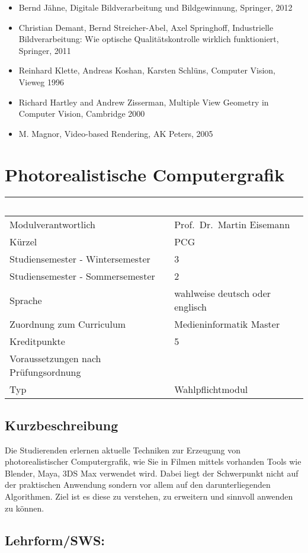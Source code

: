 \begin{itemize}
\item
  Bernd Jähne, Digitale Bildverarbeitung und Bildgewinnung, Springer,
  2012
\item
  Christian Demant, Bernd Streicher-Abel, Axel Springhoff, Industrielle
  Bildverarbeitung: Wie optische Qualitätskontrolle wirklich
  funktioniert, Springer, 2011
\item
  Reinhard Klette, Andreas Koshan, Karsten Schlüns, Computer Vision,
  Vieweg 1996
\item
  Richard Hartley and Andrew Zisserman, Multiple View Geometry in
  Computer Vision, Cambridge 2000
\item
  M. Magnor, Video-based Rendering, AK Peters, 2005
\end{itemize}

\chapter{Photorealistische
Computergrafik}\label{photorealistische-computergrafik}

\begin{longtable}[]{@{}ll@{}}
\toprule
~ & ~\tabularnewline
\midrule
\endhead
Modulverantwortlich & Prof.~Dr.~Martin Eisemann\tabularnewline
Kürzel & PCG\tabularnewline
Studiensemester - Wintersemester & 3\tabularnewline
Studiensemester - Sommersemester & 2\tabularnewline
Sprache & wahlweise deutsch oder englisch\tabularnewline
Zuordnung zum Curriculum & Medieninformatik Master\tabularnewline
Kreditpunkte & 5\tabularnewline
Voraussetzungen nach Prüfungsordnung & ~\tabularnewline
Typ & Wahlpflichtmodul\tabularnewline
\bottomrule
\end{longtable}

\section*{Kurzbeschreibung}\label{kurzbeschreibung-13}

Die Studierenden erlernen aktuelle Techniken zur Erzeugung von
photorealistischer Computergrafik, wie Sie in Filmen mittels vorhanden
Tools wie Blender, Maya, 3DS Max verwendet wird. Dabei liegt der
Schwerpunkt nicht auf der praktischen Anwendung sondern vor allem auf
den darunterliegenden Algorithmen. Ziel ist es diese zu verstehen, zu
erweitern und sinnvoll anwenden zu können.

\section*{Lehrform/SWS:}\label{lehrformsws-22}

